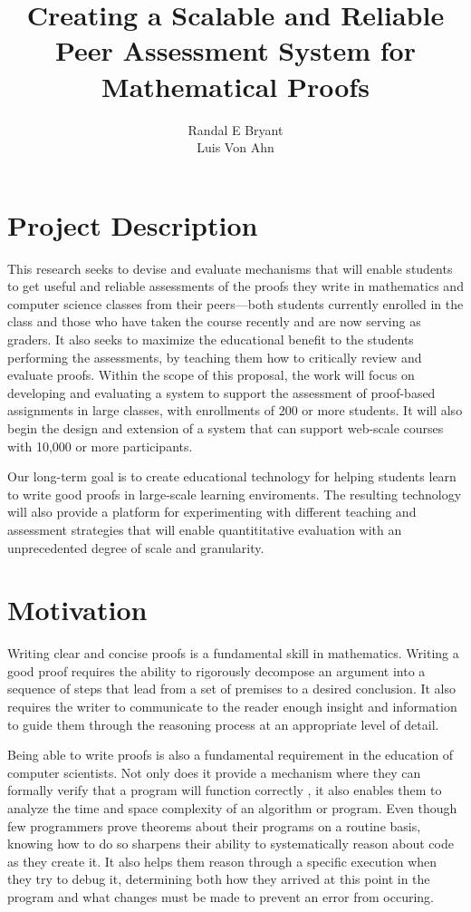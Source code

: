 \documentclass[12pt]{article}
\title{Creating a Scalable and Reliable Peer Assessment System for
  Mathematical Proofs}
\author{Randal E Bryant \\ Luis Von Ahn}
\begin{document}
\section*{Project Description}

This research seeks to devise and evaluate mechanisms that will enable
students to get useful and reliable assessments of the proofs they
write in mathematics and computer science classes from their
peers---both students currently enrolled in the class and those who
have taken the course recently and are now serving as graders.  It
also seeks to maximize the educational benefit to the students
performing the assessments, by teaching them how to critically review
and evaluate proofs.  Within the scope of this proposal, the work will
focus on developing and evaluating a system to support the assessment
of proof-based assignments in large classes, with enrollments of 200
or more students.  It will also begin the design and extension of a
system that can support web-scale courses with 10,000 or more
participants.

Our long-term goal is to create educational technology for helping
students learn to write good proofs in large-scale learning
enviroments.  The resulting technology will also provide a platform
for experimenting with different teaching and assessment strategies
that will enable quantititative evaluation with an unprecedented
degree of scale and granularity.

\section{Motivation}

Writing clear and concise proofs is a fundamental skill
in mathematics.  Writing a good proof requires the ability to
rigorously decompose an argument into a sequence of steps that lead
from a set of premises to
a desired conclusion.  It also requires the
writer to communicate to the reader enough insight and information to guide them
through the reasoning process at an appropriate level of detail.

Being able to write proofs is also a fundamental requirement in the
education of computer scientists.  Not only does it provide a
mechanism where they can formally verify that a program will function
correctly \cite{hoare-cacm69}, it also enables them to analyze the
time and space complexity of an algorithm or program.  Even though few
programmers prove theorems about their programs on a routine basis,
knowing how to do so sharpens their ability to systematically reason
about code as they create it.  It also helps them reason through a
specific execution when they try to debug it, determining both how
they arrived at this point in the program and what changes must be
made to prevent an error from occuring.
\end{document}
